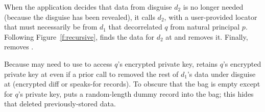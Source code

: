 %
When the application decides that data from disguise $d_2$ is no longer
needed (\eg because the disguise has been revealed), it calls
$d_2$, \fn{)} with a user-provided locator
that must necessarily be from $d_1$ that decorrelated $q$ from natural principal
$p$.
%
Following Figure~\ref{f:recursive}, \sys finds the data for $d_2$ at
 and removes it.
%
Finally, \sys removes .
%

%
Because \sys may need to use  to access $q$'s encrypted private key,
\sys retains $q$'s encrypted private key at  even if a prior call to
 removed the rest of $d_1$'s data under
disguise at  (\ie encrypted diff or speaks-for records).
%
To obscure that the bag is empty except for $q$'s private key,
\sys puts a random-length dummy record into the bag; this hides that \sys
deleted previously-stored data.
%
%
%

